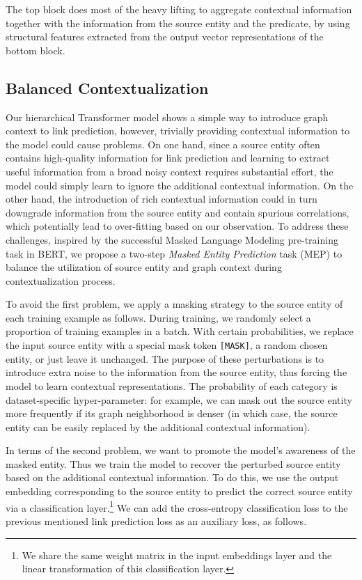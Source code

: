 \documentclass[11pt]{article}
\begin{document}
The top block does most of the heavy lifting to aggregate contextual information together with the information from the source entity and the predicate, by using structural features extracted from the output vector representations of the bottom block.

\subsection{Balanced Contextualization} \label{sec:mem}
Our hierarchical Transformer model shows a simple way to introduce graph context to link prediction, however, trivially providing contextual information to the model could cause problems.
On one hand, since a source entity often contains high-quality information for link prediction and learning to extract useful information from a broad noisy context requires substantial effort, the model could simply learn to ignore the additional contextual information.
On the other hand, the introduction of rich contextual information could in turn downgrade information from the source entity and contain spurious correlations, which potentially lead to over-fitting based on our observation.
To address these challenges, inspired by the successful Masked Language Modeling pre-training task in BERT, we propose a two-step \emph{Masked Entity Prediction} task (MEP) to balance the utilization of source entity and graph context during contextualization process.

To avoid the first problem, we apply a masking strategy to the source entity of each training example as follows.
During training, we randomly select a proportion of training examples in a batch.
With certain probabilities, we replace the input source entity with a special mask token \texttt{[MASK]}, a random chosen entity, or just leave it unchanged.
The purpose of these perturbations is to introduce extra noise to the information from the source entity, thus forcing the model to learn contextual representations.
The probability of each category is dataset-specific hyper-parameter: for example, we can mask out the source entity more frequently if its graph neighborhood is denser (in which case, the source entity can be easily replaced by the additional contextual information).

In terms of the second problem, we want to promote the model's awareness of the masked entity. Thus we train the model to recover the perturbed source entity based on the additional contextual information.
To do this, we use the output embedding corresponding to the source entity  to predict the correct source entity via a classification layer.\footnote{We share the same weight matrix in the input embeddings layer and the linear transformation of this classification layer.}
We can add the cross-entropy classification loss to the previous mentioned link prediction loss as an auxiliary loss, as follows.
\end{document}
